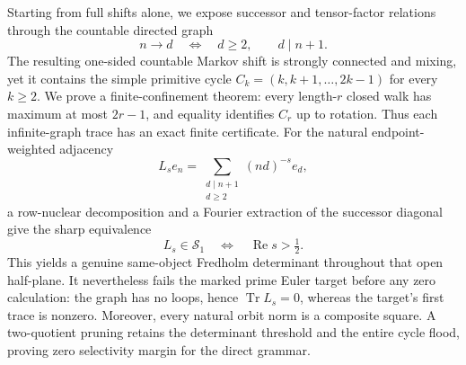Starting from full shifts alone, we expose successor and tensor-factor
relations through the countable directed graph
\[
 n\longrightarrow d
 \quad\Longleftrightarrow\quad
 d\ge2,\qquad d\mid n+1.
\]
The resulting one-sided countable Markov shift is strongly connected and
mixing, yet it contains the simple primitive cycle
\(C_k=(k,k+1,\ldots,2k-1)\) for every \(k\ge2\).
We prove a finite-confinement theorem: every length-\(r\) closed walk has
maximum at most \(2r-1\), and equality identifies \(C_r\) up to rotation.
Thus each infinite-graph trace has an exact finite certificate.  For the
natural endpoint-weighted adjacency
\[
 L_se_n=\sum_{\substack{d\mid n+1\\d\ge2}}(nd)^{-s}e_d,
\]
a row-nuclear decomposition and a Fourier extraction of the successor
diagonal give the sharp equivalence
\[
 L_s\in\mathcal S_1\quad\Longleftrightarrow\quad
 \operatorname{Re}s>\tfrac12.
\]
This yields a genuine same-object Fredholm determinant throughout that open
half-plane.  It nevertheless fails the marked prime Euler target before any
zero calculation: the graph has no loops, hence \(\operatorname{Tr}L_s=0\),
whereas the target's first trace is nonzero.  Moreover, every natural orbit
norm is a composite square.  A two-quotient pruning retains the determinant
threshold and the entire cycle flood, proving zero selectivity margin for the
direct grammar.
